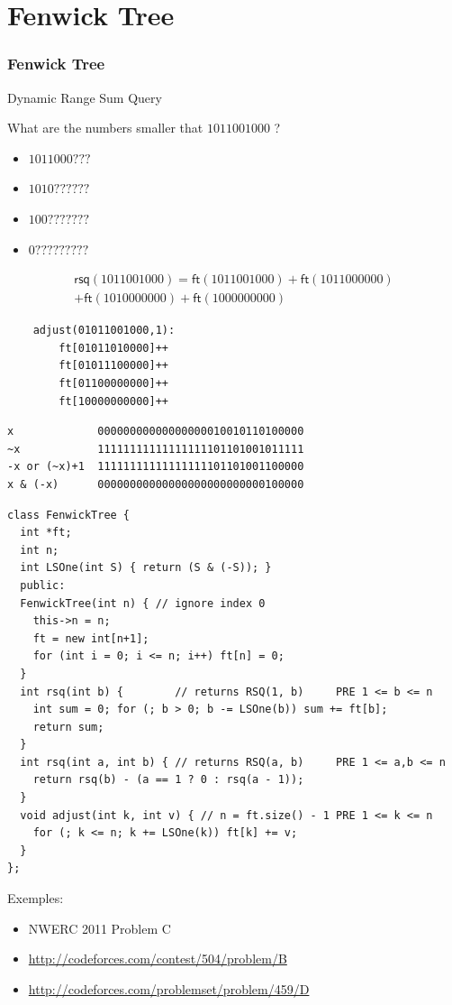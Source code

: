 \documentclass[10pt,svgnames,usenames,table]{beamer} %
\begin{document}
\section{Fenwick Tree}
\begin{frame}
  \frametitle{Fenwick Tree}
  Dynamic Range Sum Query

  What are the numbers smaller that $1011001000$ ?
  \begin{itemize}
    \item $1011000???$
    \item $1010??????$
    \item $100???????$
    \item $0?????????$
  \end{itemize}
  \begin{multline*}
    \mathsf{rsq}(1011001000)
    = \mathsf{ft}(1011001000)
    + \mathsf{ft}(1011000000)\\
    + \mathsf{ft}(1010000000)
    + \mathsf{ft}(1000000000)
  \end{multline*}

  \begin{lstlisting}
    adjust(01011001000,1):
        ft[01011010000]++
        ft[01011100000]++
        ft[01100000000]++
        ft[10000000000]++
  \end{lstlisting}

  \begin{lstlisting}
x             00000000000000000010010110100000
~x            11111111111111111101101001011111
-x or (~x)+1  11111111111111111101101001100000
x & (-x)      00000000000000000000000000100000
  \end{lstlisting}

  \framebreak
  \begin{lstlisting}
class FenwickTree {
  int *ft;
  int n;
  int LSOne(int S) { return (S & (-S)); }
  public:
  FenwickTree(int n) { // ignore index 0
    this->n = n;
    ft = new int[n+1];
    for (int i = 0; i <= n; i++) ft[n] = 0;
  }
  int rsq(int b) {        // returns RSQ(1, b)     PRE 1 <= b <= n
    int sum = 0; for (; b > 0; b -= LSOne(b)) sum += ft[b];
    return sum;
  }
  int rsq(int a, int b) { // returns RSQ(a, b)     PRE 1 <= a,b <= n
    return rsq(b) - (a == 1 ? 0 : rsq(a - 1));
  }
  void adjust(int k, int v) { // n = ft.size() - 1 PRE 1 <= k <= n
    for (; k <= n; k += LSOne(k)) ft[k] += v;
  }
};
  \end{lstlisting}
  \framebreak
  Exemples:
  \begin{itemize}
    \item NWERC 2011 Problem C
    \item \url{http://codeforces.com/contest/504/problem/B}
    \item \url{http://codeforces.com/problemset/problem/459/D}
  \end{itemize}
\end{frame}
\end{document}
